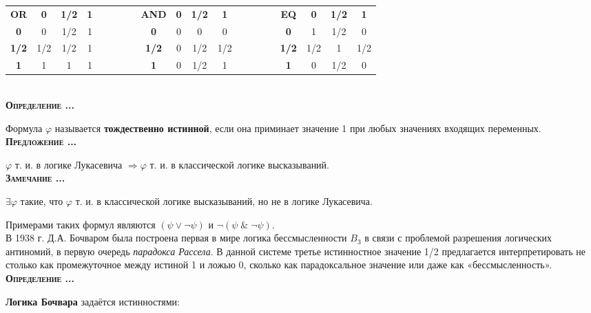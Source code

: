\documentclass[18pt, a4paper]{extarticle}
\newcounter{par}
\newcounter{spar}
\newcounter{zap}
\newcommand{\opr}{\textbf{\textsc{Определение \thepar.\if\thespar1\thespar.\fi\thezap.\;}}\stepcounter{zap}}
\newcommand{\predl}{\textbf{\textsc{Предложение \thepar.\if\thespar1\thespar.\fi\thezap.\;}}\stepcounter{zap}}
\newcommand{\zam}{\textbf{\textsc{Замечание \thepar.\if\thespar1\thespar.\fi\thezap.\;}}\stepcounter{zap}}
\newcommand{\ampersand}{\;\&\;}
\begin{document}
\begin{center}
\begin{tabular}{|c|c|c|c|llll|c|c|c|c|llll|c|c|c|c|}
\cline{1-4} \cline{9-12} \cline{17-20}
\textbf{OR} & \textbf{0} & \textbf{1/2} & \textbf{1} & & & & & \textbf{AND} & \textbf{0} & \textbf{1/2} & \textbf{1} & & & & & \textbf{EQ} & \textbf{0} & \textbf{1/2} & \textbf{1} \\
\cline{1-4} \cline{9-12} \cline{17-20} 
\textbf{0} & 0 & 1/2 & 1 & & & & & \textbf{0} & 0 & 0 & 0 & & & & & \textbf{0} & 1 & 1/2 & 0 \\ 
\cline{1-4} \cline{9-12} \cline{17-20} 
\textbf{1/2} & 1/2 & 1/2 & 1 & & & & & \textbf{1/2} & 0 & 1/2 & 1/2 & & & & & \textbf{1/2} & 1/2 & 1 & 1/2 \\ 
\cline{1-4} \cline{9-12} \cline{17-20} 
\textbf{1} & 1 & 1 & 1 & & & & & \textbf{1} & 0 & 1/2 & 1 & & & & & \textbf{1} & 0 & 1/2 & 0 \\ 
\cline{1-4} \cline{9-12} \cline{17-20} 
\end{tabular}
\end{center}\\

\opr

Формула $\varphi$ называется \textbf{тождественно истинной}, если она приминает значение 1 при любых значениях входящих переменных.\\

\predl

$\varphi$ т. и. в логике Лукасевича $\Rightarrow \varphi$ т. и. в классической логике высказываний.\\

\zam

$\exists \varphi$ такие, что $\varphi$ т. и. в классической логике высказываний, но не в логике Лукасевича.

Примерами таких формул являются $(\psi\vee\lnot\psi)$ и $\lnot(\psi\ampersand\lnot\psi)$.\\

В 1938 г. Д.А. Бочваром была построена первая в мире логика бессмысленности $B_3$ в связи с проблемой разрешения логических антиномий, в первую очередь
\textit{парадокса Рассела}. В данной системе третье истинностное значение 1/2 предлагается интерпретировать не столько как промежуточное между истиной 1 и ложью 0, сколько как парадоксальное значение или даже как «бессмысленность».\\

\opr

\textbf{Логика Бочвара} задаётся истинностями: 
\end{document}
